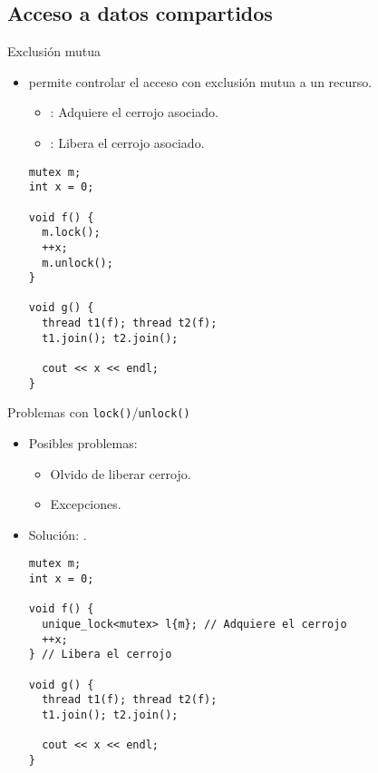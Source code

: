 \subsection{Acceso a datos compartidos}

\begin{frame}[fragile]{Exclusión mutua}
\begin{itemize}
  \item {} permite controlar el acceso con exclusión mutua a un recurso.
    \begin{itemize}
      \item {}: Adquiere el cerrojo asociado.
      \item {}: Libera el cerrojo asociado.
    \end{itemize}
\begin{lstlisting}
mutex m;
int x = 0;

void f() {
  m.lock();
  ++x;
  m.unlock();
}

void g() {
  thread t1(f); thread t2(f);
  t1.join(); t2.join();

  cout << x << endl;
}
\end{lstlisting}
\end{itemize}
\end{frame}

\begin{frame}[fragile]{Problemas con \texttt{lock()}/\texttt{unlock()}}
\begin{itemize}
  \item Posibles problemas:
    \begin{itemize}
      \item Olvido de liberar cerrojo.
      \item Excepciones.
    \end{itemize}
  \item Solución: .
\begin{lstlisting}
mutex m;
int x = 0;

void f() {
  unique_lock<mutex> l{m}; // Adquiere el cerrojo
  ++x;
} // Libera el cerrojo

void g() {
  thread t1(f); thread t2(f);
  t1.join(); t2.join();

  cout << x << endl;
}
\end{lstlisting}
\end{itemize}
\end{frame}

